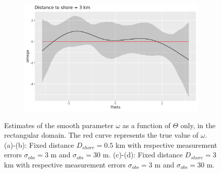 \documentclass[11pt]{article}
\newcommand {\1}{\mathbb{1}}
\begin{document}
\begin{figure}[H]
\begin{subfigure}{0.48\textwidth}
		\caption{}
	\end{subfigure}
	\begin{subfigure}{0.48\textwidth}
		\centering
		\includegraphics[scale=0.3]{images/simulation study/crcvm_rect_hf_e1_omega_far.png}
		\caption{}
	\end{subfigure}
	\caption{Estimates of the smooth parameter $\omega$ as a function of $\Theta$ only, in the rectangular domain. The red curve represents the true value of $\omega$. (a)-(b): Fixed distance $D_{shore}=0.5$ km with respective measurement errors $\sigma_{obs}=3$ m and $\sigma_{obs}=30$ m. (c)-(d): Fixed distance $D_{shore}=3$ km with respective measurement errors $\sigma_{obs}=3$ m and $\sigma_{obs}=30$ m.}
\label{fig: marginal_estimates_rect_CRCVM}
\end{figure}
\end{document}
